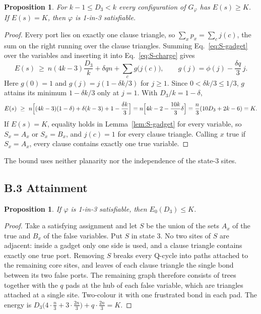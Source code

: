 \documentclass[aps,pre,onecolumn,nofootinbib]{revtex4-2}
\newtheorem{proposition}[theorem]{Proposition}
\theoremstyle{remark}
\begin{document}
\begin{proposition}\label{prop:S-bound}
For $k-1\le D_3<k$ every configuration of $G_\varphi$ has $E(s)\ge K$. If $E(s)=K$, then $\varphi$
is 1-in-3 satisfiable.
\end{proposition}
\begin{proof}
Every port lies on exactly one clause triangle, so $\sum_xp_x=\sum_cj(c)$, the sum on the right
running over the clause triangles. Summing Eq.~\eqref{eq:S-gadget} over the variables and inserting
it into Eq.~\eqref{eq:S-charge} gives
\begin{equation}
E(s)\ \ge\ n(4k-3)\frac{D_3}{k}+\delta qn+\sum_cg\bigl(j(c)\bigr),\qquad
g(j)=\phi(j)-\frac{\delta q}{3}\,j .
\end{equation}
Here $g(0)=1$ and $g(j)=j(1-\delta k/3)$ for $j\ge1$. Since $0<\delta k/3\le1/3$, $g$ attains its
minimum $1-\delta k/3$ only at $j=1$. With $D_3/k=1-\delta$,
\[
E(s)\ \ge\ n\Bigl[(4k-3)(1-\delta)+\delta(k-3)+1-\frac{\delta k}{3}\Bigr]
=n\Bigl[4k-2-\frac{10k}{3}\delta\Bigr]=\frac n3(10D_3+2k-6)=K.
\]
If $E(s)=K$, equality holds in Lemma~\ref{lem:S-gadget} for every variable, so $S_x=A_x$ or
$S_x=B_x$, and $j(c)=1$ for every clause triangle. Calling $x$ true if $S_x=A_x$, every clause
contains exactly one true variable.
\end{proof}
The bound uses neither planarity nor the independence of the state-3 sites.

\subsection*{B.3 Attainment}

\begin{proposition}\label{prop:S-attain}
If $\varphi$ is 1-in-3 satisfiable, then $E_0(D_3)\le K$.
\end{proposition}
\begin{proof}
Take a satisfying assignment and let $S$ be the union of the sets $A_x$ of the true and $B_x$ of
the false variables. Put $S$ in state 3. No two sites of $S$ are adjacent: inside a gadget only
one side is used, and a clause triangle contains exactly one true port. Removing $S$ breaks every
Q-cycle into paths attached to the remaining core sites, and leaves of each clause triangle the
single bond between its two false ports. The remaining graph therefore consists of trees together
with the $q$ pads at the hub of each false variable, which are triangles attached at a single
site. Two-colour it with one frustrated bond in each pad. The energy is
$D_3\bigl(4\cdot\tfrac n3+3\cdot\tfrac{2n}3\bigr)+q\cdot\tfrac{2n}3=K$.
\end{proof}
\end{document}
